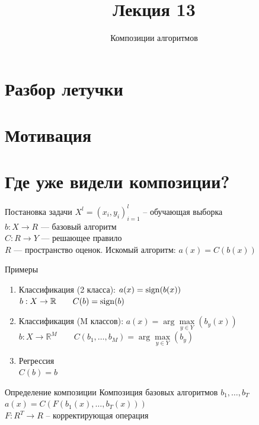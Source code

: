 \documentclass[10pt]{beamer}
\title{Лекция 13}
\subtitle{Композиции алгоритмов}
\begin{document}
\section{Разбор летучки}

\maketitle

\section{Мотивация}

\section{Где уже видели композиции?}

\begin{frame}{Постановка задачи}
  ${X^l = (x_i, y_i)_{i = 1}^l}$ -- обучающая выборка\\
  $b:X \rightarrow R$ --- базовый алгоритм\\
  $C:R \rightarrow Y$ --- решающее правило\\
  $R$ --- пространство оценок.
  \bigbreak
  Искомый алгоритм: $a(x) = C(b(x))$\\
\end{frame}

\begin{frame}{Примеры}
  \begin{enumerate}
    \item Классификация (2 класса): \qquad $a(x) = \operatorname{sign}(b(x))$\\      
      $b: X \rightarrow \mathbb{R} \qquad C(b) = \operatorname{sign}(b)$
    \item Классификация (M классов): \qquad $a(x) = \arg\max\limits_{y \in Y} (b_y(x))$\\      
      $b: X \rightarrow \mathbb{R}^M \qquad C(b_1, \dots, b_M) = \arg\max\limits_{y \in Y}(b_y)$
    \item Регрессия\\
      $C(b) = b$      
  \end{enumerate}
\end{frame}

\begin{frame}{Определение композиции}
  Композиция базовых алгоритмов $b_1, \dots, b_T$\\
  \bigbreak
  $a(x) = C(F(b_1(x), \dots, b_T(x)))$\\
  $F: R^T \rightarrow R$ -- корректирующая операция
\end{frame}
\end{document}
